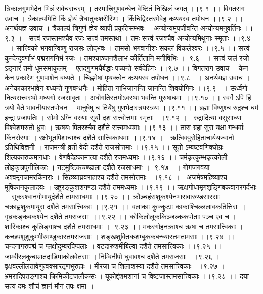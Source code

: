 \documentclass[11pt]{book}
\begin{document}
\begin{landscape}
त्रिकालगुणभेदेन भिन्नं सर्वचराचरम् ।
तस्मात्त्रिगुणबन्धेन वेष्टितं निखिलं जगत् ।।९.१ ।।
विगतराग उवाच ।
त्रैकाल्यमिति किं ज्ञेयं त्रैधातुकशरीरिणः ।
किंचिद्विस्तरमेवेह कथयस्व तपोधन ।।९.२ ।।
अनर्थयज्ञ उवाच ।
त्रैकाल्यं त्रिगुणं ज्ञेयं व्यापी प्रकृतिसम्भवः ।
अन्योन्यमुपजीवन्ति अन्योन्यमनुवर्तिनः ।।९.३ ।।
सत्त्वं रजस्तमश्चैव रजः सत्त्वं तमस्तथा ।
तमः सत्त्वं रजश्चैव अन्योन्यमिथुनाः स्मृताः ।।९.४ ।।
सात्त्विको भगवान्विष्णु राजसः लोद्भवः ।
तामसो भगवानीशः सकलं विकलेश्वरः ।।९.५ ।।
सत्त्वं कुन्देन्दुवर्णाभं पद्मरागनिभं रजः ।
तमश्चाञ्जनशैलाभं कीर्तितानि मनीषिभिः ।।९.६ ।।
सत्त्वं जलं रजो ऽङ्गारं तमो धूमसमाकुलम् ।
एतद्गुणमयैर्बद्धाः पच्यन्ते सर्वदेहिनः ।।९.७ ।।
विगतराग उवाच ।
केन केन प्रकारेण गुणपाशेन बध्यते ।
चिह्नमेषां पृथक्त्वेन कथयस्व तपोधन ।।९.८ ।।
अनर्थयज्ञ उवाच ।
अनेकाकारभावेन बध्यन्ते गुणबन्धनैः ।
मोहिता नाभिजानन्ति जानन्ति शिवयोगिनः ।।९.९ ।।
ऊर्ध्वंगो नित्यसत्त्वस्थो मध्यगो रजसावृतः ।
अधोगतिस्तमोऽवस्था भवन्ति पुरुषाधमाः ।।९.१० ।।
स्वर्गे ऽपि हि त्रयो वैते भावनीयास्तपोधन ।
मानुषेषु च तिर्येषु गुणभेदास्त्रयस्त्रयः ।।९.११ ।।
ब्रह्मा विष्णुश्च रुद्रश्च धर्म इन्द्रः प्रजापतिः ।
सोमो ऽग्नि वरुणः सूर्यो दश सत्त्वोत्तमाः स्मृताः ।।९.१२ ।।
रुद्रादित्या वसुसाध्याः विश्वेशमरुतो ध्रुवः ।
ऋषयः पितरश्चैव दशैते सत्त्वमध्यमाः ।।९.१३ ।।
तारा ग्रहा सुरा यक्षा गन्धर्वाः किंनरोरगाः ।
रक्षोभूतपिशाचाश्च दशैते सात्त्विकाधमाः ।।९.१४ ।।
ऋत्विक्पुरोहिताचार्ययज्वानो ऽतिथिविज्ञनी ।
राजमन्त्री व्रती वेदी दशैते राजसोत्तमाः ।।९.१५ ।।
सूतो ऽम्बष्टवणिक्चोग्रः शिल्पकारुकमागधाः ।
वेणवैदेहकामात्या दशैते रजमध्यमाः ।।९.१६ ।।
चर्मकृत्कुम्भकृत्कोली लोहकृत्त्रपुनीलिकाः ।
नटमुष्टिकचण्डाला दशैते रजसाधमाः ।।९.१७ ।।
गोगजगवया अश्वमृगचामरकिंनराः ।
सिंहव्याघ्रवराहाश्च दशैते तमसोत्तमाः ।।९.१८ ।।
अजमेषमहिष्याश्च मूषिकानकुलादयः ।
उष्ट्ररङ्कुशशगण्डा दशैते तममध्यमाः ।।९.१९ ।।
ऋक्षगोधामृगशृङ्गिबकवानरगर्दभाः ।
सूकरश्वानगोमायुर्दशैते तामसाधमाः ।।९.२० ।।
क्रौञ्चहंसशुकश्येनभासवारुण्डसारसाः ।
चक्राह्वशुकमायूरा दशैते तमसात्त्विकाः ।।९.२१ ।।
वलाकाः कुक्कुटाः काकाश्चिल्ललावकतित्तिराः ।
गृध्रकङ्कबकश्येन दशैते तमराजसाः ।।९.२२ ।।
कोकिलोलूककिञ्जल्ककपोताः पञ्च एव च ।
शारिकाश्च कुलिङ्गाश्च दशैते तमसाधमाः ।।९.२३ ।।
मकरगोहनक्राश्च ऋषा च तमसात्त्विकाः ।
कच्छपशुशुकुम्भीरमण्डुकास्तमराजसाः ।
शङ्खशुक्तिकशम्बूककबन्ध्यास्तमतामसाः ।।९.२४ ।।
चन्दनागरुपद्मं च प्लक्षोदुम्बरपिप्पलाः ।
वटदारुशमीबिल्वा दशैते तमसात्त्विकाः ।।९.२५ ।।
जाम्बीरलकुचाम्रातदाडिमाकोलवेतसाः ।
निम्बिनीपो धुवावश्च दशैते तमराजसाः ।।९.२६ ।।
वृक्षवल्लीलतावेणुत्वक्सारतृणभूरुहाः ।
मीरजा च शिलाशस्या दशैते तमसात्त्विकाः ।।९.२७ ।।
भ्रमरादिपतङ्गाश्च क्रिमिकीटजलौकसः ।
यूकोद्दंशमशानां च विष्टजास्तमसात्त्विकाः ।।९.२८ ।।
दया सत्यं दमः शौचं ज्ञानं मौनं तपः क्षमा ।

\end{landscape}
\end{document}
